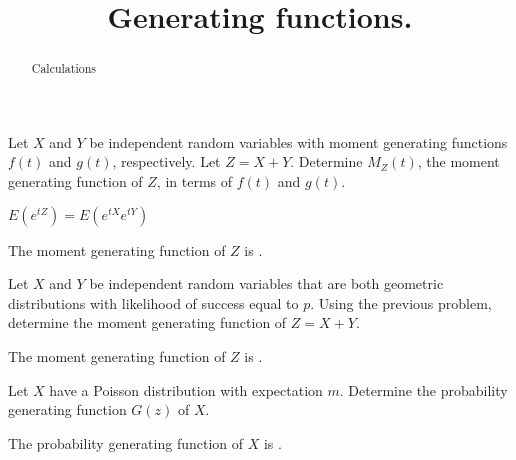 \documentclass{ximera}
\title{Generating functions.}
\begin{document}
\begin{abstract}
Calculations
\end{abstract}
\maketitle

\begin{question} 
Let $X$ and $Y$ be independent random variables with moment generating functions $f(t)$ and $g(t)$, respectively. Let $Z=X+Y$. Determine $M_{Z}(t)$, the moment generating function of $Z$, in terms of $f(t)$ and $g(t)$. 
     \begin{hint}
          $E(e^{tZ}) = E(e^{tX}e^{tY})$
     \end{hint}
     \begin{solution}
          The moment generating function of $Z$ is .
     \end{solution}
\end{question}

\begin{question}
Let $X$ and $Y$ be independent random variables that are both geometric distributions with likelihood of success equal to $p$. Using the previous problem, determine the moment generating function of $Z=X+Y$. 
     \begin{solution}
          The moment generating function of $Z$ is .
     \end{solution}
\end{question}

\begin{question}
Let $X$ have a Poisson distribution with expectation $m$. Determine the probability generating function $G(z)$ of $X$.
     \begin{solution}
          The probability generating function of $X$ is .
     \end{solution}
\end{question}
\end{document}

